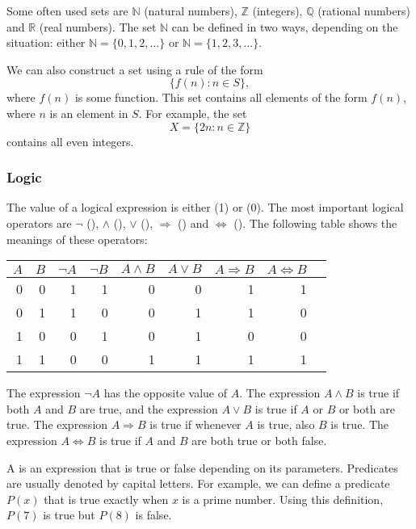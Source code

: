 Some often used sets are
$\mathbb{N}$ (natural numbers),
$\mathbb{Z}$ (integers),
$\mathbb{Q}$ (rational numbers) and
$\mathbb{R}$ (real numbers).
The set $\mathbb{N}$
can be defined in two ways, depending
on the situation:
either $\mathbb{N}=\{0,1,2,\ldots\}$
or $\mathbb{N}=\{1,2,3,...\}$.

We can also construct a set using a rule of the form
\[\{f(n) : n \in S\},\]
where $f(n)$ is some function.
This set contains all elements of the form $f(n)$,
where $n$ is an element in $S$.
For example, the set
\[X=\{2n : n \in \mathbb{Z}\}\]
contains all even integers.

\subsubsection{Logic}


The value of a logical expression is either
 (1) or  (0).
The most important logical operators are
$\lnot$ (),
$\land$ (),
$\lor$ (),
$\Rightarrow$ () and
$\Leftrightarrow$ ().
The following table shows the meanings of these operators:

\begin{center}
\begin{tabular}{rr|rrrrrrr}
$A$ & $B$ & $\lnot A$ & $\lnot B$ & $A \land B$ & $A \lor B$ & $A \Rightarrow B$ & $A \Leftrightarrow B$ \\
\hline
0 & 0 & 1 & 1 & 0 & 0 & 1 & 1 \\
0 & 1 & 1 & 0 & 0 & 1 & 1 & 0 \\
1 & 0 & 0 & 1 & 0 & 1 & 0 & 0 \\
1 & 1 & 0 & 0 & 1 & 1 & 1 & 1 \\
\end{tabular}
\end{center}

The expression $\lnot A$ has the opposite value of $A$.
The expression $A \land B$ is true if both $A$ and $B$
are true,
and the expression $A \lor B$ is true if $A$ or $B$ or both
are true.
The expression $A \Rightarrow B$ is true
if whenever $A$ is true, also $B$ is true.
The expression $A \Leftrightarrow B$ is true
if $A$ and $B$ are both true or both false.


A  is an expression that is true or false
depending on its parameters.
Predicates are usually denoted by capital letters.
For example, we can define a predicate $P(x)$
that is true exactly when $x$ is a prime number.
Using this definition, $P(7)$ is true but $P(8)$ is false.

